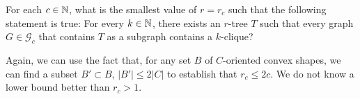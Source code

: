 \documentclass[lotsofwhite]{patmorin}
\begin{document}
\begin{op}
   For each $c\in\mathbb{N}$, what is the smallest value of $r=r_c$ such that the
   following statement is true: For every $k\in\mathbb{N}$, there exists an
   $r$-tree $T$ such that every graph $G\in\mathcal{G}_c$ that contains
   $T$ as a subgraph contains a $k$-clique?
\end{op}

Again, we can use the fact that, for any set $B$ of $C$-oriented convex
shapes, we can find a subset $B'\subset B$, $|B'|\le 2|C|$ to establish
that $r_c \le 2c$.  We do not know a lower bound better than $r_c > 1$.



\end{document}
